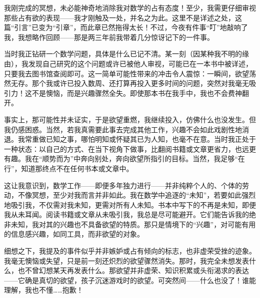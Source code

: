 我刚完成的冥想，未必能神奇地消除我对数学的占有态度！至少，我需更仔细审视那些占有欲的表现——我才刚触及一处，并名之为此。这里不是详述之处，这篇“引言”已变为“引章”，而此章已然拖得太长！不过，今夜有件事“叮”地敲响了我，我想略作回顾——那是两三年前我带着几分惊讶记下的一件事。

当时我正钻研一个数学问题，具体是什么已记不清。某一刻（因某种我不明的缘由），我发现自己研究的这个问题或许已被他人审视，可能已在一本书中被详述，只要我去图书馆查阅即可。这一简单可能性带来的冲击令人震惊：一瞬间，欲望荡然无存。那个我或许已投入数周、还打算再投入更多时间的问题，突然对我毫无吸引力！这不是懊恼，而是兴趣骤然全失。即使那本书在我手中，我也不会费神翻开。

事实上，那可能性并未证实，于是欲望重燃，我继续投入，仿佛什么也没发生。但我仍感困惑。当然，若我真需要此事去完成其他工作，兴趣不会如此戏剧性地消退。我常重做已知之事，哪怕明知或怀疑其已为人知，也毫不在意。当时我正处于一种状态：以自己的方式、在当下视角下做事，比翻阅书籍或文章更省力，也远更有趣。我在“顺势而为”中奔向别处，奔向欲望所指引的目标。当然，我足够“在行”，知道那终点不在任何书本或文章中。

这让我意识到，数学工作——即便多年独力进行——并非纯粹个人的、个体的劳动，不像冥想，至少对我而言并非如此。我在数学中追逐的“未知”，若要如此强烈地吸引我，不仅需对我未知，更需对所有人未知。书本中写下的不再是未知，即便我从未耳闻。阅读书籍或文章从未吸引我，我总是尽可能避开。它们能告诉我的绝非未知，我对其的兴趣也不具备欲望的特质。那只是情境下的“兴趣”，对可能有用的信息感兴趣，如同工具，而非欲望的对象。

细想之下，我提及的事件似乎并非嫉妒或占有倾向的标志，也非虚荣受挫的迹象。我毫无懊恼或失望，只是前一刻还炽烈的欲望骤然消失。那时，我完全未想发表什么，也不曾幻想某天再发表什么。那欲望并非虚荣、知识积累或头衔渴求的表达——它确是真切的欲望，孩子沉迷游戏时的欲望。可突然间——什么也没了！谁能理解，我也不懂……抱歉！